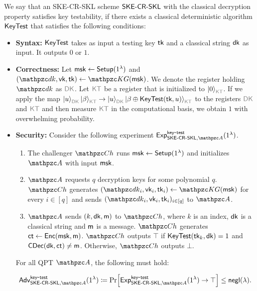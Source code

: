 \begin{definition}\label{def:key-testability-SKE}
We say that an SKE-CR-SKL scheme $\mathsf{SKE}\textrm{-}\mathsf{CR}\textrm{-}\mathsf{SKL}$ with the classical
decryption property satisfies key testability, if there exists a
classical deterministic algorithm $\mathsf{KeyTest}$ that satisfies the
following conditions:

\begin{itemize}
\item \textbf{Syntax:} $\mathsf{KeyTest}$ takes as input a testing key $\mathsf{tk}$
and a classical string $\mathsf{dk}$ as input. It outputs $0$ or $1$.

\item \textbf{Correctness:} Let $\mathsf{msk}\leftarrow\mathsf{Setup}(1^\lambda)$ and
$(\qdk,\vk,\tk)\gets\qKG(\msk)$. We denote the register holding
$\qdk$ as $\qreg{DK}$. Let $\qreg{KT}$ be a register that is
initialized to $\ket{0}_{\qreg{KT}}$. If we apply the map
$\ket{u}_{\qreg{DK}}\ket{\beta}_{\qreg{KT}}\ra\ket{u}_{\qreg{DK}}\ket{\beta\oplus\KeyTest(\tk,u)}_{\qreg{KT}}$
to the registers $\qreg{DK}$ and $\qreg{KT}$ and then measure
$\qreg{KT}$ in the computational basis, we obtain $1$ with
overwhelming probability.

\item \textbf{Security:} Consider the following experiment
$\expb{\SKECRSKL,\qA}{key}{test}(1^\secp)$.

\begin{enumerate}
\item The challenger $\qCh$ runs $\mathsf{msk}\leftarrow\mathsf{Setup}(1^\lambda)$ and
initializes $\qA$ with input $\mathsf{msk}$. 

\item $\qA$ requests $q$ decryption keys for some polynomial $q$.
$\qCh$ generates $(\qdk_i,\vk_i,\allowbreak\tk_i)\gets\qKG(\msk)$
for every $i\in[q]$ and sends $(\qdk_i,\vk_i,\tk_i)_{i\in[q]}$ to
$\qA$.

\item $\qA$ sends $(k, \mathsf{dk}, \mathsf{m})$ to $\qCh$, where $k$ is
an index, $\mathsf{dk}$ is a classical string and $\mathsf{m}$ is a message.
$\qCh$ generates $\mathsf{ct}\leftarrow\mathsf{Enc}(\mathsf{msk},\mathsf{m})$. $\qCh$ outputs $\top$ if
$\mathsf{KeyTest}(\mathsf{tk}_k,\mathsf{dk})=1$ and $\mathsf{CDec}(\mathsf{dk},\mathsf{ct})\ne\mathsf{m}$.
Otherwise, $\qCh$ outputs $\bot$.
\end{enumerate}

For all QPT $\qA$, the following must hold:

\begin{align}
\advb{\SKECRSKL,\qA}{key}{test}(1^\secp) \seteq
\Pr[\expb{\SKECRSKL,\qA}{key}{test}(1^\secp) \ra \top] \le
\negl(\secp).
\end{align} 
\end{itemize}
\end{definition}

